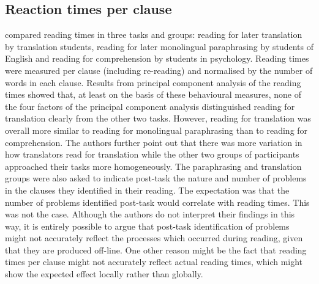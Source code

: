 \documentclass[output=paper]{LSP/langsci}
\begin{document}
\subsection{Reaction times per clause}

\citet{Shreve1993} compared reading times in three tasks and groups: reading for later translation by translation students, reading for later monolingual paraphrasing by students of English and reading for comprehension by students in psychology. Reading times were measured per clause (including re-reading) and normalised by the number of words in each clause. Results from principal component analysis of the reading times showed that, at least on the basis of these behavioural measures, none of the four factors of the principal component analysis distinguished reading for translation clearly from the other two tasks. However, reading for translation was overall more similar to reading for monolingual paraphrasing than to reading for comprehension. The authors further point out that there was more variation in how translators read for translation while the other two groups of participants approached their tasks more homogeneously. The paraphrasing and translation groups were also asked to indicate post-task the nature and number of problems in the clauses they identified in their reading. The expectation was that the number of problems identified post-task would correlate with reading times. This was not the case. Although the authors do not interpret their findings in this way, it is entirely possible to argue that post-task identification of problems might not accurately reflect the processes which occurred during reading, given that they are produced off-line. One other reason might be the fact that reading times per clause might not accurately reflect actual reading times, which might show the expected effect locally rather than globally.
\end{document}
